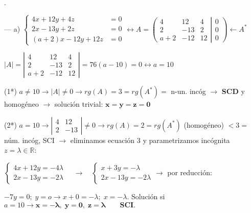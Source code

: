 \begin{proofw}\renewcommand{\qedsymbol}{$\diamond$}.


\noindent --- a) $ \begin{cases} 4x+12y+4z&=0\\2x-13y+2z&=0\\(a+2)x-12y+12z&=0    \end{cases} \leftrightarrow A= \left( \begin{matrix}  4&12&4\\2&-13&2\\a+2&-12&12      \end{matrix} \right|  \left.    \begin{matrix} 0\\0\\0   \end{matrix} \right) \leftarrow A^*$

$|A|=\left| \begin{matrix}  4&12&4\\2&-13&2\\a+2&-12&12      \end{matrix} \right| =76(a-10)=0 \leftrightarrow a=10$

\noindent (1*) $a\neq 10 \to |A|\neq 0 \to rg(A)=3=rg(A^*)=$ n-un. incóg $\to$ \textbf{SCD} y homogéneo $\to$ solución trivial: $\boldsymbol{ x=y=z=0}$
	
\noindent (2*) $a=10 \to \left| \begin{matrix} 4&12\\2&-13 \end{matrix} \right| \neq 0 \to rg(A)=2=rg(A^*) $ (homogéneo) $< 3 = $ núm. incóg, SCI $\to$ eliminamos ecuación $3$ y parametrizamos incógnita $z=\lambda \in \mathbb R$:

\noindent $\begin{cases} 4x+12y=-4\lambda \\2x-13y=-2\lambda \end{cases} \quad \to \quad \begin{cases} x+3y=-\lambda \\2x-13y=-2\lambda \end{cases} \rightarrow  $ por reducción: 

\noindent $-7y=0 ; \; y=o \to x+0=-\lambda; \; x=-\lambda$. Solución si $a=10 \longrightarrow \boldsymbol{x=-\lambda,\; y=0, \; z=\lambda\qquad SCI}.$



\end{proofw}
